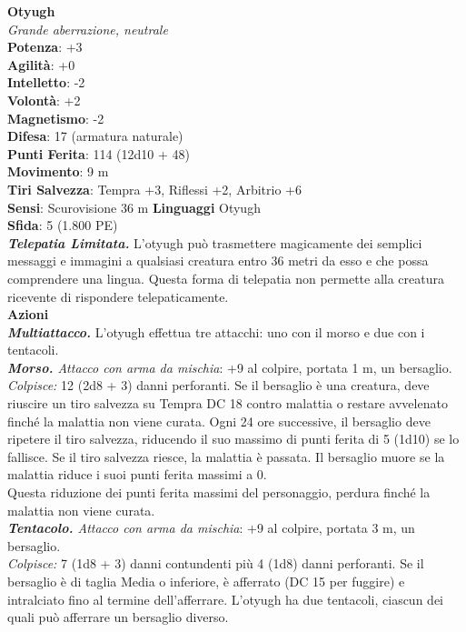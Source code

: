 \begin{multicols}{2}
\medskip\textbf{Otyugh}\\
\emph{Grande aberrazione, neutrale}\\
\textbf{Potenza}: +3\\
\textbf{Agilità}: +0\\
\textbf{Intelletto}: -2\\
\textbf{Volontà}: +2\\
\textbf{Magnetismo}: -2\\
\textbf{Difesa}: 17 (armatura naturale)\\
\textbf{Punti Ferita}: 114 (12d10 + 48)\\
\textbf{Movimento}: 9 m\\
\textbf{Tiri Salvezza}: Tempra +3, Riflessi +2, Arbitrio +6\\
\textbf{Sensi}: Scurovisione 36 m
\textbf{Linguaggi} Otyugh\\
\textbf{Sfida}: 5 (1.800 PE)\smallskip\\
\emph{\textbf{Telepatia Limitata.}} L'otyugh può trasmettere magicamente dei semplici messaggi e immagini a qualsiasi creatura entro 36 metri da esso e che possa comprendere una lingua. Questa forma di telepatia non permette alla creatura ricevente di rispondere telepaticamente.\\
\smallskip\textbf{Azioni}\\
\emph{\textbf{Multiattacco.}} L'otyugh effettua tre attacchi: uno con il morso e due con i tentacoli.\\
\emph{\textbf{Morso.} Attacco con arma da mischia}: +9 al colpire, portata 1 m, un bersaglio.\\

\emph{Colpisce:} 12 (2d8 + 3) danni perforanti. Se il bersaglio è una creatura, deve riuscire un tiro salvezza su Tempra DC  18 contro malattia o restare avvelenato finché la malattia non viene curata. Ogni 24 ore successive, il bersaglio deve ripetere il tiro salvezza, riducendo il suo massimo di punti ferita di 5 (1d10) se lo fallisce. Se il tiro salvezza riesce, la malattia è passata. Il bersaglio muore se la malattia riduce i suoi punti ferita massimi a 0.\\
Questa riduzione dei punti ferita massimi del personaggio, perdura  finché la malattia non viene curata.\\
\emph{\textbf{Tentacolo.} Attacco con arma da mischia}: +9 al colpire, portata 3 m, un bersaglio.\\
\emph{Colpisce:} 7 (1d8 + 3) danni contundenti più 4 (1d8) danni perforanti. Se il bersaglio è di taglia Media o inferiore, è afferrato (DC  15 per fuggire) e intralciato fino al termine dell'afferrare. L'otyugh ha due tentacoli, ciascun dei quali può afferrare un bersaglio diverso.\\


\end{multicols}
